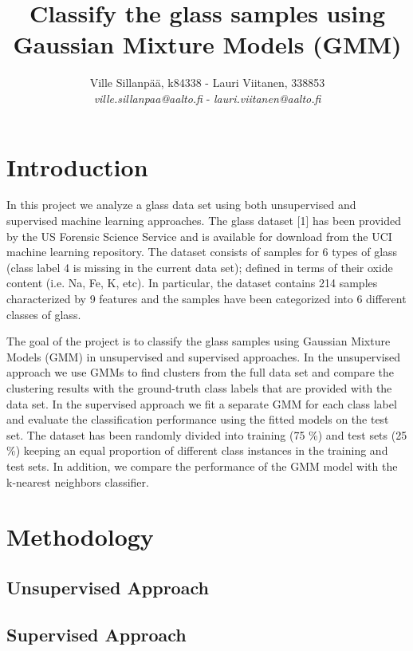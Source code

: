 \documentclass[a4paper]{article}
\title{Classify the glass samples using Gaussian Mixture Models (GMM)}
\author{Ville Sillanpää, k84338 - Lauri Viitanen, 338853 \\ 
       {\it ville.sillanpaa@aalto.fi} -
       {\it lauri.viitanen@aalto.fi}}
\begin{document}
\maketitle
\clearpage


\section{Introduction}

In this project we analyze a glass data set using both unsupervised and
supervised machine learning approaches. The glass dataset [1] has been
provided by the US Forensic Science Service and is available for download from
the UCI machine learning repository. The dataset consists of samples for 6
types of glass (class label 4 is missing in the current data set); defined in
terms of their oxide content (i.e. Na, Fe, K, etc). In particular, the dataset
contains 214 samples characterized by 9 features and the samples have been
categorized into 6 different classes of glass.

\par
The goal of the project is to classify the glass samples using Gaussian
Mixture Models (GMM) in unsupervised and supervised approaches. In the
unsupervised approach we use GMMs to find clusters from the full data set and
compare the clustering results with the ground-truth class labels that are
provided with the data set. In the supervised approach we fit a separate GMM
for each class label and evaluate the classification performance using the
fitted models on the test set. The dataset has been randomly divided into
training (75 \%) and test sets (25 \%) keeping an equal proportion of different
class instances in the training and test sets. In addition, we compare the
performance of the GMM model with the k-nearest neighbors classifier.

\section{Methodology}

\subsection{Unsupervised Approach}

\subsection{Supervised Approach}
\end{document}
